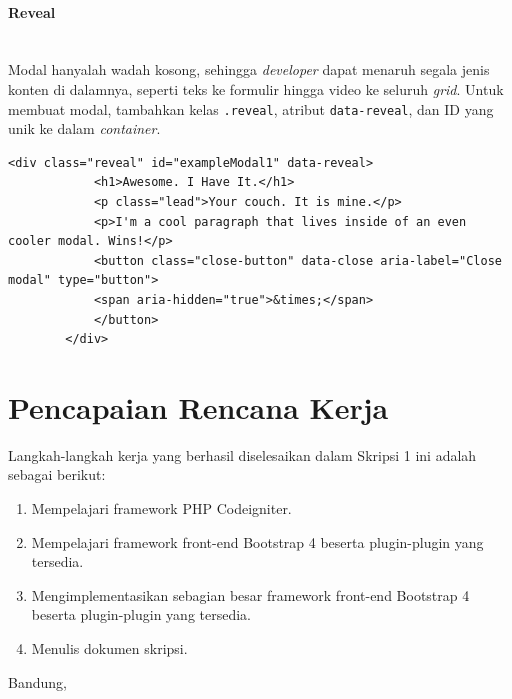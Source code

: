 \documentclass[a4paper,twoside]{article}
\newcommand{\myparagraph}[1]{\paragraph{#1}\mbox{}\\}
\begin{document}
\begin{enumerate}
		
		\myparagraph{Reveal}
		Modal hanyalah wadah kosong, sehingga \textit{developer} dapat menaruh segala jenis konten di dalamnya, seperti teks ke formulir hingga video ke seluruh \textit{grid}.
		Untuk membuat modal, tambahkan kelas \colorbox{mygray}{\texttt{.reveal}}, atribut \colorbox{mygray}{\texttt{data-reveal}}, dan ID yang unik ke dalam \textit{container}.
		
		\begin{lstlisting}[frame=single, basicstyle=\tiny] 
		<div class="reveal" id="exampleModal1" data-reveal>
			<h1>Awesome. I Have It.</h1>
			<p class="lead">Your couch. It is mine.</p>
			<p>I'm a cool paragraph that lives inside of an even cooler modal. Wins!</p>
			<button class="close-button" data-close aria-label="Close modal" type="button">
			<span aria-hidden="true">&times;</span>
			</button>
		</div>
		\end{lstlisting} 
		
		\section{Pencapaian Rencana Kerja}
		Langkah-langkah kerja yang berhasil diselesaikan dalam Skripsi 1 ini adalah sebagai berikut:
		\begin{enumerate}
			\item Mempelajari framework PHP Codeigniter.
			\item Mempelajari framework front-end Bootstrap 4 beserta plugin-plugin yang tersedia.
			\item Mengimplementasikan sebagian besar framework front-end Bootstrap 4 beserta plugin-plugin yang tersedia.
			\item Menulis dokumen skripsi.
		\end{enumerate}
		
				
		\vspace{1cm}
		\centering Bandung, \tanggal\\
		\vspace{2cm} \nama \\ 
		\vspace{1cm}
		

\end{enumerate}
\end{document}
